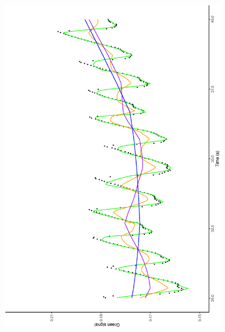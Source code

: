 \documentclass[twocolumn]{bmcart}%
\begin{document}
\begin{figure}[p]
\begin{center}
{{    				\includegraphics[width =\linewidth,angle=270]{pues1d2}
        		        }
		}\\ 	
 \resizebox{\textwidth}{!}{
        			\subfigure[]{
			    	      \label{fig:pes1d3}
}}
\end{center}
\end{figure}
\end{document}
